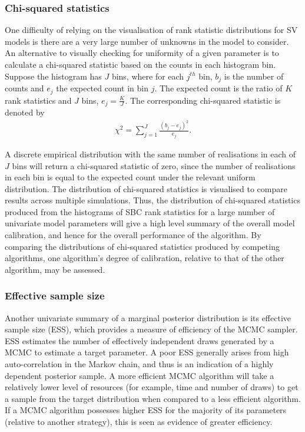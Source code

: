 \documentclass[12pt, a4paper]{article}
\begin{document}
            \subsubsection{Chi-squared statistics}
            One difficulty of relying on the visualisation of rank statistic distributions for SV models is there are a very large number of unknowns in the model to consider. An alternative to visually checking for uniformity of a given parameter is to calculate a chi-squared statistic based on the counts in each histogram bin. Suppose the histogram has $J$ bins, where for each $j^{th}$ bin, $b_j$ is the number of counts and $e_j$ the expected count in bin $j$. The expected count is the ratio of $K$ rank statistics and $J$ bins, $e_j=\frac{K}{J}$. The corresponding chi-squared statistic is denoted by
            \begin{align}
            \chi^2 = \sum_{j=1}^J \frac{(b_{j} - e_{j})^2}{e_j}.
            \end{align}
            
            A discrete empirical distribution with the same number of realisations in each of $J$ bins will return a chi-squared statistic of zero, since the number of realisations in each bin is equal to the expected count under the relevant  uniform distribution. The distribution of chi-squared statistics is visualised to compare results across multiple simulations. Thus, the distribution of chi-squared statistics produced from the histograms of SBC rank statistics for a large number of univariate model parameters will give a high level summary of the overall model calibration, and hence for the overall performance of the algorithm. By comparing the distributions of chi-squared statistics produced by competing algorithms, one algorithm's degree of calibration, relative to that of the other algorithm, may be assessed. 

            \subsubsection{Effective sample size}
            Another univariate summary of a marginal posterior distribution is its effective sample size (ESS), which provides a measure of efficiency of the MCMC sampler. ESS estimates the number of effectively independent draws generated by a MCMC to estimate a target parameter. A poor ESS generally arises from high auto-correlation in the Markov chain, and thus is an indication of a highly dependent posterior sample. A more efficient MCMC algorithm will take a relatively lower level of resources (for example, time and number of draws) to get a sample from the target distribution when compared to a less efficient algorithm. If a MCMC algorithm possesses higher ESS for the majority of its parameters (relative to another strategy), this is seen as evidence of greater efficiency.
            
\end{document}

